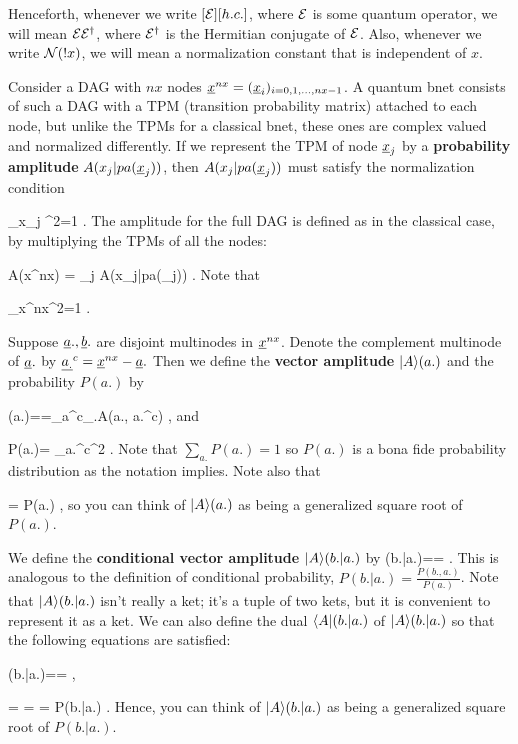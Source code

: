 \documentclass[12pt]{article}
\begin{document}
Henceforth,
whenever
we write
$[{\cal E}][h.c.]$,
where ${\cal E}$
is some quantum operator,
we will mean ${\cal E}{\cal E}^\dag$,
where ${\cal E}^\dag$
is the Hermitian conjugate
of ${\cal E}$.
Also, whenever
we write
${\cal N}(!x)$,
we will
mean a 
normalization
constant that is independent
of $x$.

Consider
a DAG with $nx$ nodes
${\underline{x}}^{nx}= ({\underline{x}}_i)_{i=0, 1, \ldots, nx-1}$.
A quantum bnet 
consists of such a DAG with 
a TPM (transition probability matrix)
attached to each node,
but unlike the TPMs for a classical bnet,
these ones are complex valued
and normalized differently.
If we represent the TPM
of node ${\underline{x}}_j$
by a {\bf probability 
amplitude} $A(x_j|pa({\underline{x}}_j))$,
then $A(x_j|pa({\underline{x}}_j))$ must satisfy
the normalization condition

\beq
\sum_{x_j}
^2=1
\;.
\eeq
The amplitude for the full
DAG is defined as in the classical
case, by multiplying
the TPMs of all the nodes:

\beq
A(x^{nx})
=
\prod_j A(x_j|pa(\rvx_j))
\;.
\eeq
Note that

\beq
\sum_{x^{nx}}^2=1
\;.
\eeq

Suppose
${\underline{a}}., {\underline{b}}.$ are disjoint multinodes 
in ${\underline{x}}^{nx}$. Denote
the complement
multinode of ${\underline{a}}.$ by
$\underline{a_.}^c={\underline{x}}^{nx}-{\underline{a}}.$ Then
we define
the {\bf vector amplitude} $|A\rangle(a.)$ 
and the probability $P(a.)$ by


\beq 
\A(a.)==\sum_{a^c_.}A(a., a.^c)
\;,
\eeq
and

\beq
P(a.)=
\sum_{a.^c}^2
\;.
\eeq
Note that $\sum_{a.} P(a.)=1$
so $P(a.)$ is a bona
fide probability
distribution as the notation implies. Note also that 

\beq
{}= P(a.)
\;, 
\eeq
so you
can think of $|A\rangle(a.)$
as being a generalized square root of $P(a.)$.



We define the {\bf conditional vector amplitude} $|A\rangle(b.|a.)$ by
\beq
\A(b.|a.)==
\;.
\eeq
This is analogous to the definition
of conditional
probability,
$P(b.|a.)=
\frac{P(b., a.)}{P(a.)}$.
Note that $|A\rangle(b.|a.)$
isn't really a ket; it's a tuple
of two kets, but it is convenient
to represent it as a ket.
We can also define the dual $\langle A|(b.|a.)$
of $|A\rangle(b.|a.)$ so that
the following equations are satisfied:

\beq
{}(b.|a.)==
\;,
\eeq

\beq
{}=
{}=
=
P(b.|a.)
\;.
\eeq
Hence, you can think of 
$|A\rangle(b.|a.)$
as being a generalized square root
of $P(b.|a.)$.
\end{document}
